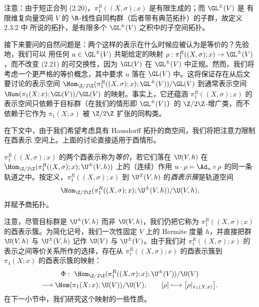 注意：由于短正合列 (2.20)，$\pi^R_1((X,\sigma);x)$ 是有限生成的；而 $\GL^{\pm}(V)$ 是
有限维复向量空间 $V$ 的 $\R$-线性自同构群（后者带有典范拓扑）的子群，故定义 2.3.2 中
所说的拓扑，是有限多个 $\GL^{\pm}(V)$ 之积中的子空间拓扑。

接下来要问的自然问题是：两个这样的表示在什么时候应被认为是等价的？先验地，我们可以
用任何 $u\in\GL^{\pm}(V)$ 共轭给定的映射
$\rho:\pi^R_1((X,\sigma);x)\to\GL^{\pm}(V)$，而不改变 (2.21) 的可交换性，因为
$\GL(V)$ 在 $\GL^{\pm}(V)$ 中正规。然而，我们将考虑一个更严格的等价概念，其中要求
$u$ 落在 $\GL(V)$ 中。这将保证存在从后文要讨论的表示空间
$\Hom_{\Z/2\Z}(\pi^R_1((X,\sigma);x);\GL^{\pm}(V))/\GL(V)$ 到通常表示空间
$\Hom(\pi_1(X;x);\GL(V))/\GL(V)$ 的映射。事实上，它还蕴涵
$\pi^R_1((X,\sigma);x)$ 的表示空间只依赖于目标群（在我们的情形即 $\GL^{\pm}(V)$）的
$\Z/2\Z$-增广类，而不依赖于它作为 $\pi_1(X;x)$ 被 $\Z/2\Z$ 扩张的同构类。

在下文中，由于我们希望考虑具有 Hausdorff 拓扑的商空间，我们将把注意力限制在酉表示
空间上。上面的讨论直接适用于酉情形。

\begin{definition}[酉表示簇]\label{def:2.3.3}
$\pi^R_1((X,\sigma);x)$ 的两个酉表示称为\emph{等价}，若它们落在
$\U(V,h)$ 在 $\Hom_{\Z/2\Z}(\pi^R_1((X,\sigma);x);\U^{\pm}(V,h))$ 上的（连续）作用
$u\cdot\rho=\Ad_u\circ\rho$ 的同一条轨道之中。按定义，$\pi^R_1((X,\sigma);x)$ 到
$\U^{\pm}(V,h)$ 的\emph{酉表示簇}是轨道空间
\[
\Hom_{\Z/2\Z}(\pi^R_1((X,\sigma);x);\U^{\pm}(V,h))/\U(V,h),
\]
并赋予商拓扑。
\end{definition}

注意，尽管目标群是 $\U^{\pm}(V,h)$ 而非 $\U(V,h)$，我们仍把它称为
$\pi^R_1((X,\sigma);x)$ 的酉表示簇。为简化记号，我们一次性固定 $V$ 上的 Hermite 度量
$h$，并直接把群 $\U(V,h)$ 与 $\U^{\pm}(V,h)$ 记作 $\U(V)$ 与 $\U^{\pm}(V)$。由于我们对
$\pi^R_1((X,\sigma);x)$ 的表示之间等价关系所作的选择，存在从
$\pi^R_1((X,\sigma);x)$ 的酉表示簇到 $\pi_1(X;x)$ 的酉表示簇的映射：
\[
\begin{gathered}
\Phi:\ \Hom_{\Z/2\Z}(\pi^R_1((X,\sigma);x);\U^{\pm}(V))/\U(V)\\
\longrightarrow\Hom(\pi_1(X;x);\U(V))/\U(V),
\qquad [\rho]\longmapsto\bigl[\rho|_{\pi_1(X;x)}\bigr].
\end{gathered}
\]
在下一小节中，我们研究这个映射的一些性质。
